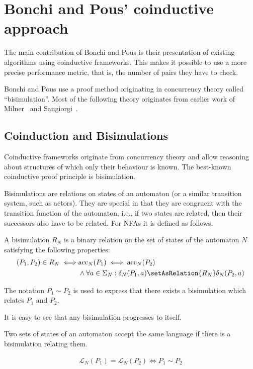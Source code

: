 \section{Bonchi and Pous' coinductive approach}

The main contribution of Bonchi and Pous is their presentation of existing
algorithms using coinductive frameworks. This makes it possible to use a more
precise performance metric, that is, the number of pairs they have to check.

Bonchi and Pous use a proof method originating in concurrency theory called
``bisimulation''. Most of the following theory originates from earlier work of
Milner~\cite{milner1989communication} and Sangiorgi~\cite{sangiorgi1998bisimulation}.

\subsection{Coinduction and Bisimulations}

Coinductive frameworks originate from concurrency theory and allow reasoning
about structures of which only their behaviour is known. The best-known
coinductive proof principle is bisimulation.

Bisimulations are relations on states of an automaton (or a similar transition
system, such as actors). They are special in that they are
congruent with the transition function of the automaton, i.e., if two states are
related, then their successors also have to be related.
For NFAs it is defined as follows:

\begin{definition}
  A bisimulation $R_N$ is a binary relation on the set of states of
  the automaton $N$ satisfying the following properties:
  \begin{align*}
    (P_1, P_2) \in R_N \iff &\text{acc}_N(P_1) \iff \text{acc}_N(P_2)\\
      &\land \forall a \in \Sigma_N: \delta_N(P_1, a) \setAsRelation{R_N} \delta_N(P_2, a)
  \end{align*}

  The notation $P_1 \sim P_2$ is used to express that there exists a bisimulation
  which relates {$P_1$ and $P_2$}.
\end{definition}



It is easy to see that any bisimulation progresses to itself.

\begin{definition}
  Two sets of states of an automaton accept the same language
  if there is a bisimulation relating them.

  \begin{align*}
    \mathcal{L}_N(P_1) = \mathcal{L}_N(P_2) \iff P_1 \sim P_2
  \end{align*}
\end{definition}

